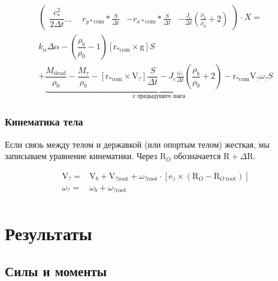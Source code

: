 \documentclass[14pt]{extreport}
\newcommand{\br}[1]{\boldsymbol{\mathrm{#1}}}
\renewcommand{\vec}[1]{\br{#1}}
\begin{document}
\begin{multline}
\label{eq_newton_moment}
\left(\begin{matrix}
	\dfrac{c_*^2}{2\Delta t}
	\dotsc
	&~~r_{y * \text{com}} * \frac{S}{\Delta t}
	&-r_{x * \text{com}} * \frac{S}{\Delta t}
	&-\frac{J_c}{\Delta t} (\frac{\rho_b}{\rho_0} +2)
\end{matrix}\right)
\cdot X =\\
	 k_\alpha \Delta \alpha - \left (\dfrac{\rho_b}{\rho_0} - 1 \right)[\vec r_{*\text{com}} \times \vec g] S\\
	+ \underbrace {
			\dfrac{M_\text{dead}}{\rho_0}
			- \dfrac{M_\tau}{\rho_0}
			- [\vec r_{*\text{com}} \times \vec V_?] \dfrac{S}{\Delta t}
			- J_c \frac{\omega_?}{\Delta t} \left( \dfrac{\rho_b}{\rho_0}  + 2 \right)
			- \vec r_{*\text{com}} \vec V_? \omega_? S
		}_{\text{с предыдущего шага}}
\end{multline}

\subsubsection{Кинематика тела}
\label{slau_kinematics}

Если связь между телом и державкой (или опортым телом) жесткая, мы записываем уравнение кинематики. Через $\vec R_O$ обозначается $\vec R+\Delta \vec R$.

\begin{equation*}
\begin{split}
\vec V_? =& \vec V_b + \vec V_{?\text{root}} +\omega_{?\text{root}} \cdot
[\vec e_z \times \left( \vec R_O - \vec R_{O~\text{root}} \right)] \\
\omega_? =& \omega_b + \omega_{?\text{root}} \\
\end{split}
\end{equation*}

\section{Результаты}
\subsection{Силы и моменты}
\end{document}
